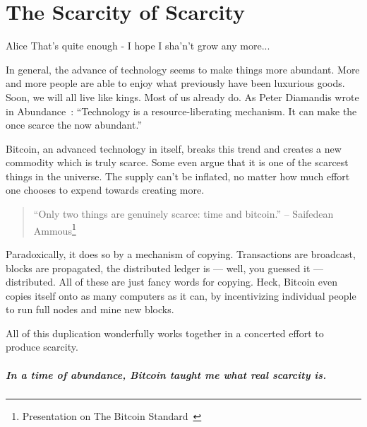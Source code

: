 
\chapter{The Scarcity of Scarcity}
\label{les:2}

\begin{chapquote}{Alice}
That's quite enough - I hope I sha'n't grow any more...
\end{chapquote}

In general, the advance of technology seems to make things more abundant. More
and more people are able to enjoy what previously have been luxurious goods.
Soon, we will all live like kings. Most of us already do. As Peter Diamandis
wrote in Abundance~\cite{abundance}: \enquote{Technology is a resource-liberating
mechanism. It can make the once scarce the now abundant.}

Bitcoin, an advanced technology in itself, breaks this trend and creates
a new commodity which is truly scarce. Some even argue that it is one of
the scarcest things in the universe. The supply can't be inflated, no
matter how much effort one chooses to expend towards creating more.

\begin{quotation}
\enquote{Only two things are genuinely scarce: time and bitcoin.}
\flushright -- Saifedean Ammous\footnote{Presentation on The Bitcoin Standard~\cite{bitcoinstandard-pres}}
\end{quotation}

Paradoxically, it does so by a mechanism of copying. Transactions are
broadcast, blocks are propagated, the distributed ledger is --- well,
you guessed it --- distributed. All of these are just fancy words for
copying. Heck, Bitcoin even copies itself onto as many computers as it
can, by incentivizing individual people to run full nodes and mine new
blocks.

All of this duplication wonderfully works together in a concerted effort
to produce scarcity.

\paragraph{In a time of abundance, Bitcoin taught me what real scarcity is.}

